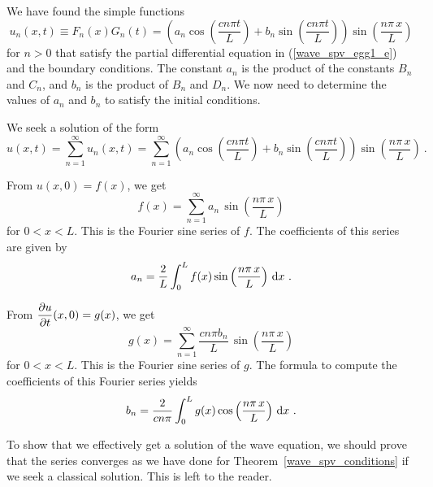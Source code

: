 \begin{egg}
We have found the simple functions
\[
u_n(x,t) \equiv F_n(x)G_n(t) =
\left( a_n \cos\left(\frac{cn\pi t}{L}\right)
+ b_n \sin\left(\frac{cn\pi t}{L}\right) \right)
\sin\left(\frac{n\pi\,x}{L}\right)
\]
for $n>0$ that satisfy the partial differential equation in
(\ref{wave_spv_egg1_e}) and the boundary conditions.  The constant
$a_n$ is the product of the constants $B_n$ and $C_n$, and $b_n$ is
the product of $B_n$ and $D_n$.  We now need to determine the values
of $a_n$ and $b_n$ to satisfy the initial conditions.

We seek a solution of the form
\[
u(x,t) = \sum_{n=1}^\infty u_n(x,t)
= \sum_{n=1}^\infty
\left( a_n \cos\left(\frac{cn\pi t}{L}\right)
+ b_n \sin\left(\frac{cn\pi t}{L}\right) \right)
\sin\left(\frac{n\pi\,x}{L}\right) \ .
\]

From $u(x,0) = f(x)$, we get
\[
f(x) = \sum_{n=1}^\infty a_n\,\sin\left(\frac{n\pi\,x}{L}\right)
\]
for $0<x<L$.  This is the Fourier sine series of $f$.  The coefficients of
this series are given by
\[
a_n = \frac{2}{L} \int_0^L f(x)
\sin\left(\frac{n\pi\,x}{L}\right) \,\mathrm{d}{x} \  .
\]

From $\displaystyle \frac{\partial{u}}{\partial t}(x,0) = g(x)$, we get
\[
g(x) =\sum_{n=1}^\infty \frac{cn\pi b_n}{L}\,
\sin\left(\frac{n\pi\,x}{L}\right)
\]
for $0<x<L$.  This is the Fourier sine series of $g$.  The formula to
compute the coefficients of this Fourier series yields
\[
b_n = \frac{2}{cn\pi} \int_0^L g(x)
\cos\left(\frac{n\pi\,x}{L}\right) \,\mathrm{d}{x} \  .
\]

To show that we effectively get a solution of the wave equation, we
should prove that the series converges as we have done for
Theorem~\ref{wave_spv_conditions} if we seek a classical solution.
This is left to the reader.
\end{egg}

